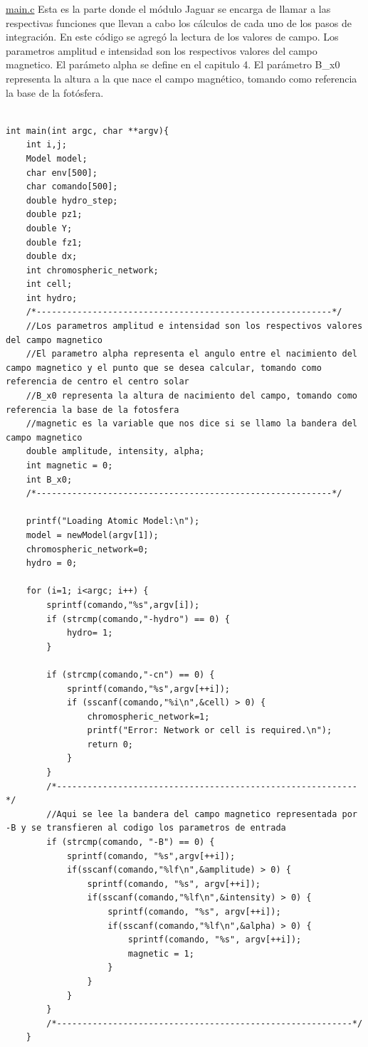 \documentclass[9pt]{book}
\begin{document}
\underline{main.c}
Esta es la parte donde el m\'odulo Jaguar se encarga de llamar a las respectivas funciones que llevan a cabo los c\'alculos de cada uno de los pasos de integraci\'on. En este c\'odigo se agreg\'o la lectura de los valores de campo.\newline
Los parametros amplitud e intensidad son los respectivos valores del campo magnetico.\newline
El par\'ameto alpha se define en el capitulo 4.\newline
El par\'ametro B\_x0 representa la altura a la que nace el campo magn\'etico, tomando como referencia la base de la fot\'osfera.
\begin{lstlisting}[style=CStyle]

int main(int argc, char **argv){
	int i,j;
	Model model;
	char env[500];
	char comando[500];
	double hydro_step;
	double pz1;
	double Y;
	double fz1;
	double dx;
	int chromospheric_network;
	int cell;
	int hydro;
	/*----------------------------------------------------------*/
	//Los parametros amplitud e intensidad son los respectivos valores del campo magnetico
	//El parametro alpha representa el angulo entre el nacimiento del campo magnetico y el punto que se desea calcular, tomando como referencia de centro el centro solar
	//B_x0 representa la altura de nacimiento del campo, tomando como referencia la base de la fotosfera
	//magnetic es la variable que nos dice si se llamo la bandera del campo magnetico
	double amplitude, intensity, alpha;
	int magnetic = 0;
	int B_x0;
	/*----------------------------------------------------------*/

	printf("Loading Atomic Model:\n");
	model = newModel(argv[1]);
	chromospheric_network=0;
	hydro = 0;

	for (i=1; i<argc; i++) {
		sprintf(comando,"%s",argv[i]);
		if (strcmp(comando,"-hydro") == 0) {
			hydro= 1;
		}

		if (strcmp(comando,"-cn") == 0) {
			sprintf(comando,"%s",argv[++i]);
			if (sscanf(comando,"%i\n",&cell) > 0) {
				chromospheric_network=1;
				printf("Error: Network or cell is required.\n");
				return 0;
			}
		}
		/*-----------------------------------------------------------*/	
		//Aqui se lee la bandera del campo magnetico representada por -B y se transfieren al codigo los parametros de entrada
		if (strcmp(comando, "-B") == 0) {
			sprintf(comando, "%s",argv[++i]);
			if(sscanf(comando,"%lf\n",&amplitude) > 0) {
				sprintf(comando, "%s", argv[++i]);
				if(sscanf(comando,"%lf\n",&intensity) > 0) {
					sprintf(comando, "%s", argv[++i]);
					if(sscanf(comando,"%lf\n",&alpha) > 0) {
						sprintf(comando, "%s", argv[++i]);
						magnetic = 1;
					}
				}
			}
		}
		/*----------------------------------------------------------*/	
	}


\end{lstlisting}
\end{document}
